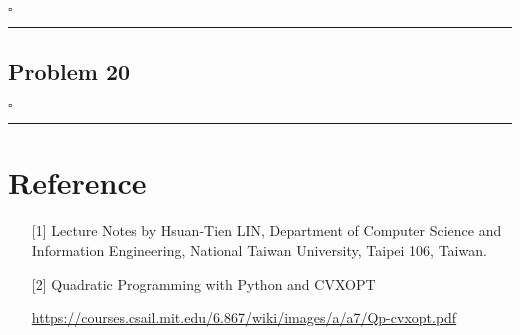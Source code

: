 \documentclass[12pt]{article}
\newcommand*{\QEDB}{\hfill\ensuremath{\square}}
\newcommand{\horrule}[1]{\rule{\linewidth}{#1}}
\begin{document}
\QEDB

\horrule{0.5pt}

\subsection*{Problem 20}

\QEDB

\horrule{0.5pt}

\section*{Reference}

\begin{enumerate}

\item[{[1]}] Lecture Notes by Hsuan-Tien LIN, Department of Computer Science and Information Engineering, National Taiwan University, Taipei 106, Taiwan.

\item[{[2]}] Quadratic Programming with Python and CVXOPT

\url{https://courses.csail.mit.edu/6.867/wiki/images/a/a7/Qp-cvxopt.pdf}

\end{enumerate}
\end{document}
